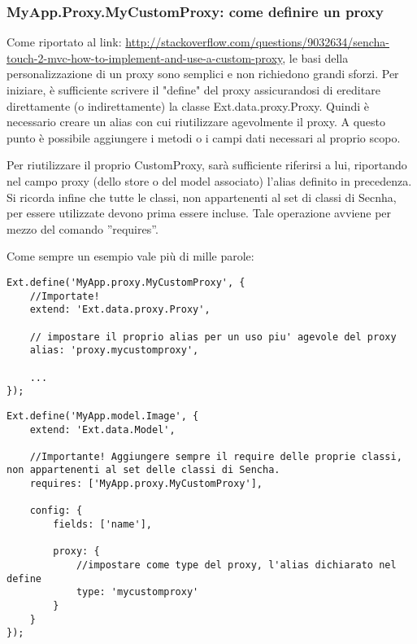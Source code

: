 \documentclass[10pt,a4paper,onecolumn]{article}
\begin{document}
\subsubsection{MyApp.Proxy.MyCustomProxy: come definire un proxy}

Come riportato al link: \url{http://stackoverflow.com/questions/9032634/sencha-touch-2-mvc-how-to-implement-and-use-a-custom-proxy}, le basi della personalizzazione di un proxy sono semplici e non richiedono grandi sforzi. Per iniziare, è sufficiente scrivere il "define" del proxy assicurandosi di ereditare direttamente (o indirettamente) la classe Ext.data.proxy.Proxy. Quindi è necessario creare un alias con cui riutilizzare agevolmente il proxy. A questo punto è possibile aggiungere i metodi o i campi dati necessari al proprio scopo.

Per riutilizzare il proprio CustomProxy, sarà sufficiente riferirsi a lui, riportando nel campo proxy (dello store o del model associato) l'alias definito in precedenza. Si ricorda infine che tutte le classi, non appartenenti al set di classi di Secnha, per essere utilizzate devono prima essere incluse. Tale operazione avviene per mezzo del comando ''requires''.

Come sempre un esempio vale più di mille parole:

\begin{lstlisting}
Ext.define('MyApp.proxy.MyCustomProxy', {
	//Importate!
    extend: 'Ext.data.proxy.Proxy',

    // impostare il proprio alias per un uso piu' agevole del proxy
    alias: 'proxy.mycustomproxy',

    ...
});
\end{lstlisting}

\begin{lstlisting}
Ext.define('MyApp.model.Image', {
    extend: 'Ext.data.Model',

    //Importante! Aggiungere sempre il require delle proprie classi, non appartenenti al set delle classi di Sencha.
    requires: ['MyApp.proxy.MyCustomProxy'],

    config: {
        fields: ['name'],

        proxy: {
            //impostare come type del proxy, l'alias dichiarato nel define
            type: 'mycustomproxy'
        }
    }
});
\end{lstlisting}
\end{document}

